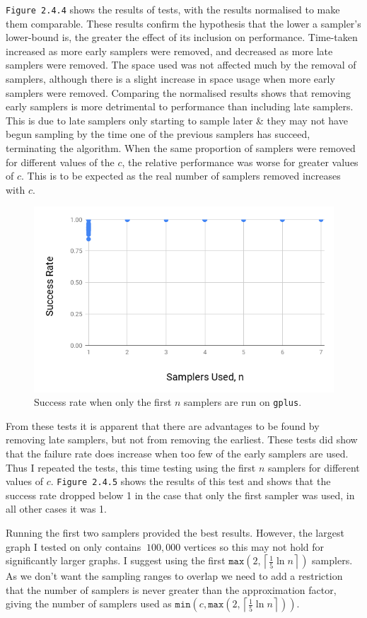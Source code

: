 \documentclass[11pt,twoside,a4paper]{report}
\begin{document}
\par \texttt{Figure 2.4.4} shows the results of tests, with the results normalised to make them comparable. These results confirm the hypothesis that the lower a sampler's lower-bound is, the greater the effect of its inclusion on performance. Time-taken increased as more early samplers were removed, and decreased as more late samplers were removed. The space used was not affected much by the removal of samplers, although there is a slight increase in space usage when more early samplers were removed. Comparing the normalised results shows that removing early samplers is more detrimental to performance than including late samplers. This is due to late samplers only starting to sample later \& they may not have begun sampling by the time one of the previous samplers has succeed, terminating the algorithm. When the same proportion of samplers were removed for different values of the  $c$, the relative performance was worse for greater values of $c$. This is to be expected as the real number of samplers removed increases with $c$.

\begin{figure}[H]
	\label{Figure 6}
	\centering
	\includegraphics[width=.5\textwidth]{img/gplusSuccessRate.png}
	\caption{Success rate when only the first $n$ samplers are run on \texttt{gplus}.}
\end{figure}

\par From these tests it is apparent that there are advantages to be found by removing late samplers, but not from removing the earliest. These tests did show that the failure rate does increase when too few of the early samplers are used. Thus I repeated the tests, this time testing using the first $n$ samplers for different values of $c$. \texttt{Figure 2.4.5} shows the results of this test and shows that the success rate dropped below 1 in the case that only the first sampler was used, in all other cases it was 1.

\par Running the first two samplers provided the best results. However, the largest graph I tested on only contains $~100,000$ vertices so this may not hold for significantly larger graphs. I suggest using the first $\mathtt{max}\left(2,\left\lceil\frac15\ln n\right\rceil\right)$ samplers. As we don't want the sampling ranges to overlap we need to add a restriction that the number of samplers is never greater than the approximation factor, giving the number of samplers used as $\mathtt{min}\left(c,\mathtt{max}\left(2,\left\lceil\frac15\ln n\right\rceil\right)\right)$.
\end{document}
